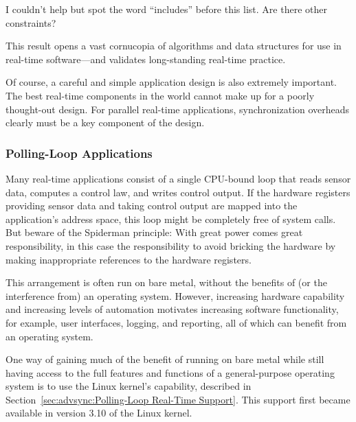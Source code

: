 \QuickQuiz{}
	I couldn't help but spot the word ``includes'' before this list.
	Are there other constraints?
 \QuickQuizEnd

This result opens a vast cornucopia of algorithms and data structures
for use in real-time software---and validates long-standing real-time practice.

Of course, a careful and simple application design is also extremely
important.
The best real-time components in the world cannot make up for a
poorly thought-out design.
For parallel real-time applications, synchronization overheads clearly
must be a key component of the design.

\subsubsection{Polling-Loop Applications}
\label{sec:advsync:Polling-Loop Applications}

Many real-time applications consist of a single CPU-bound loop that
reads sensor data, computes a control law, and writes control output.
If the hardware registers providing sensor data and taking control
output are mapped into the application's address space, this loop
might be completely free of system calls.
But beware of the Spiderman principle: With great power comes great
responsibility, in this case the responsibility to avoid bricking the
hardware by making inappropriate references to the hardware registers.

This arrangement is often run on bare metal, without the benefits of
(or the interference from) an operating system.
However, increasing hardware capability and increasing levels of
automation motivates increasing software functionality, for example,
user interfaces, logging, and reporting, all of which can benefit from
an operating system.

One way of gaining much of the benefit of running on bare metal while
still having access to the full features and functions of a
general-purpose operating system is to use the Linux kernel's
 capability, described in
Section~\ref{sec:advsync:Polling-Loop Real-Time Support}.
This support first became available in version 3.10 of the Linux kernel.

